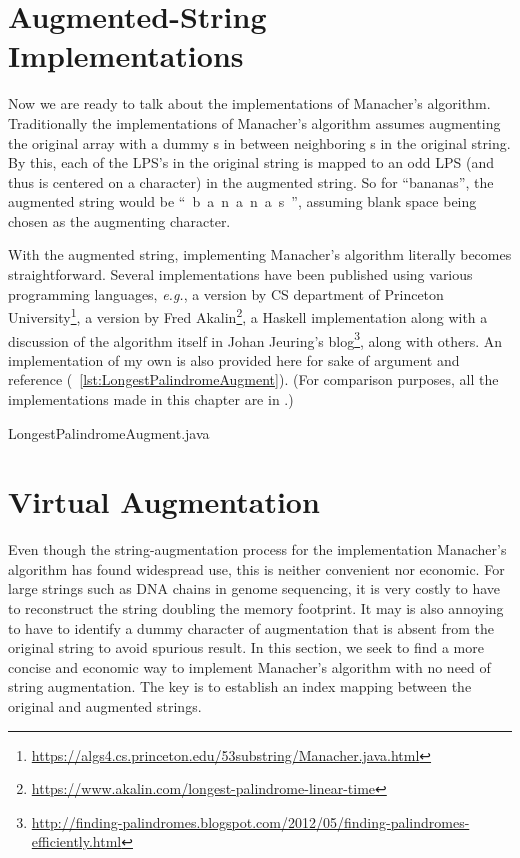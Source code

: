\section{Augmented-String Implementations}\label{sec:implementation-lps-augmented}

Now we are ready to talk about the implementations of Manacher's algorithm.
Traditionally the implementations of Manacher's algorithm assumes augmenting the original array with
a dummy s in between neighboring s in the original string.
By this, each of the LPS's in the original string is mapped to an odd LPS (and thus is centered
on a character) in the augmented string.
So for  \mbox{``bananas''}, the augmented string would be \mbox{`` b a n a n a s ''},
assuming blank space being chosen as the augmenting character.

With the augmented string, implementing Manacher's algorithm literally becomes straightforward.
Several implementations have been published using various programming languages, \textit{e.g.},
a \java version by CS department of Princeton
University\footnote{\url{https://algs4.cs.princeton.edu/53substring/Manacher.java.html}},
a \python version by Fred Akalin\footnote{\url{https://www.akalin.com/longest-palindrome-linear-time}},
a Haskell implementation along with a discussion of the algorithm itself
in Johan Jeuring's blog\footnote{
\url{http://finding-palindromes.blogspot.com/2012/05/finding-palindromes-efficiently.html}},
along with others.
An implementation of my own is also provided here for sake of argument and reference
(~\autoref{lst:LongestPalindromeAugment}).
(For comparison purposes, all the implementations made in this chapter are in \java.)

\newpage
\begin{clisting}[H]
    
    {LongestPalindromeAugment.java}
\end{clisting}


\section{Virtual Augmentation}\label{sec:virtualMapping}

Even though the string-augmentation process for the implementation Manacher's algorithm has found
widespread use, this is neither convenient nor economic.
For large strings such as DNA chains in genome sequencing, it is very costly to have to
reconstruct the string doubling the memory footprint.
It may is also annoying to have to identify a dummy character of augmentation
that is absent from the original string to avoid spurious result.
In this section, we seek to find a more concise and economic way to
implement Manacher's algorithm with no need of string augmentation.
The key is to establish an index mapping between the original and augmented strings.


